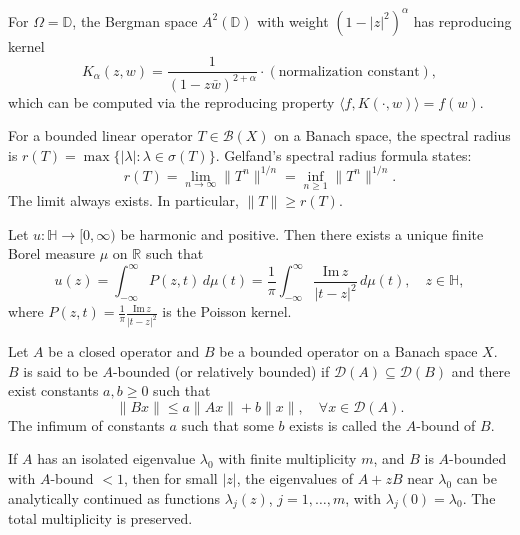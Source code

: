 \begin{example}
For $\Omega = \mathbb{D}$, the Bergman space $A^2(\mathbb{D})$ with weight $(1-|z|^2)^{\alpha}$ has reproducing kernel
\[ K_\alpha(z,w) = \frac{1}{(1-z\bar{w})^{2+\alpha}} \cdot (\text{normalization constant}), \]
which can be computed via the reproducing property $\langle f, K(\cdot,w) \rangle = f(w)$.
\end{example}

\begin{example}
For a bounded linear operator $T \in \mathcal{B}(X)$ on a Banach space, the spectral radius is $r(T) = \max \{ |\lambda| : \lambda \in \sigma(T) \}$. Gelfand's spectral radius formula states:
\[ r(T) = \lim_{n \to \infty} \|T^n\|^{1/n} = \inf_{n \geq 1} \|T^n\|^{1/n}. \]
The limit always exists. In particular, $\|T\| \geq r(T)$.
\end{example}

\begin{example}
Let $u: \mathbb{H} \to [0, \infty)$ be harmonic and positive. Then there exists a unique finite Borel measure $\mu$ on $\mathbb{R}$ such that
\[ u(z) = \int_{-\infty}^{\infty} P(z, t)\, d\mu(t) = \frac{1}{\pi} \int_{-\infty}^{\infty} \frac{\mathrm{Im}\,z}{|t-z|^2}\, d\mu(t), \quad z \in \mathbb{H}, \]
where $P(z,t) = \frac{1}{\pi}\frac{\mathrm{Im}\,z}{|t-z|^2}$ is the Poisson kernel.
\end{example}

\begin{definition}
Let $A$ be a closed operator and $B$ be a bounded operator on a Banach space $X$. $B$ is said to be $A$-bounded (or relatively bounded) if $\mathcal{D}(A) \subseteq \mathcal{D}(B)$ and there exist constants $a, b \geq 0$ such that
\[ \|Bx\| \leq a\|Ax\| + b\|x\|, \quad \forall x \in \mathcal{D}(A). \]
The infimum of constants $a$ such that some $b$ exists is called the $A$-bound of $B$.
\end{definition}

\begin{example}
If $A$ has an isolated eigenvalue $\lambda_0$ with finite multiplicity $m$, and $B$ is $A$-bounded with $A$-bound $< 1$, then for small $|z|$, the eigenvalues of $A+zB$ near $\lambda_0$ can be analytically continued as functions $\lambda_j(z)$, $j=1,\ldots,m$, with $\lambda_j(0) = \lambda_0$. The total multiplicity is preserved.
\end{example}

